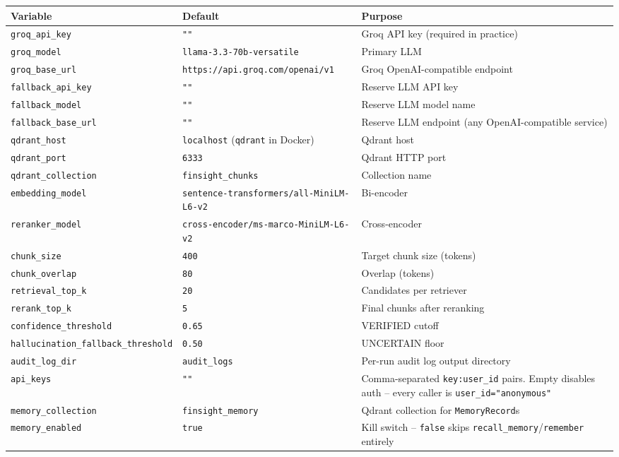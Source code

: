 \documentclass[11pt,a4paper]{report}
\newcommand{\code}[1]{\texttt{#1}}
\begin{document}
\begin{longtable}{@{}p{4.2cm}p{3.6cm}p{5.8cm}@{}}
\toprule
\textbf{Variable} & \textbf{Default} & \textbf{Purpose} \\
\midrule
\endhead
\code{groq\_api\_key} & \code{""} & Groq API key (required in practice) \\
\code{groq\_model} & \code{llama-3.3-70b-versatile} & Primary LLM \\
\code{groq\_base\_url} & \code{https://api.groq.com/openai/v1} & Groq OpenAI-compatible
endpoint \\
\code{fallback\_api\_key} & \code{""} & Reserve LLM API key \\
\code{fallback\_model} & \code{""} & Reserve LLM model name \\
\code{fallback\_base\_url} & \code{""} & Reserve LLM endpoint (any OpenAI-compatible
service) \\
\code{qdrant\_host} & \code{localhost} (\code{qdrant} in Docker) & Qdrant host \\
\code{qdrant\_port} & \code{6333} & Qdrant HTTP port \\
\code{qdrant\_collection} & \code{finsight\_chunks} & Collection name \\
\code{embedding\_model} & \code{sentence-transformers/all-MiniLM-L6-v2} & Bi-encoder \\
\code{reranker\_model} & \code{cross-encoder/ms-marco-MiniLM-L6-v2} & Cross-encoder \\
\code{chunk\_size} & \code{400} & Target chunk size (tokens) \\
\code{chunk\_overlap} & \code{80} & Overlap (tokens) \\
\code{retrieval\_top\_k} & \code{20} & Candidates per retriever \\
\code{rerank\_top\_k} & \code{5} & Final chunks after reranking \\
\code{confidence\_threshold} & \code{0.65} & VERIFIED cutoff \\
\code{hallucination\_fallback\_threshold} & \code{0.50} & UNCERTAIN floor \\
\code{audit\_log\_dir} & \code{audit\_logs} & Per-run audit log output directory \\
\code{api\_keys} & \code{""} & Comma-separated \code{key:user\_id} pairs. Empty disables auth -- every caller is \code{user\_id="anonymous"} \\
\code{memory\_collection} & \code{finsight\_memory} & Qdrant collection for \code{MemoryRecord}s \\
\code{memory\_enabled} & \code{true} & Kill switch -- \code{false} skips \code{recall\_memory}/\code{remember} entirely \\

\end{longtable}
\end{document}
